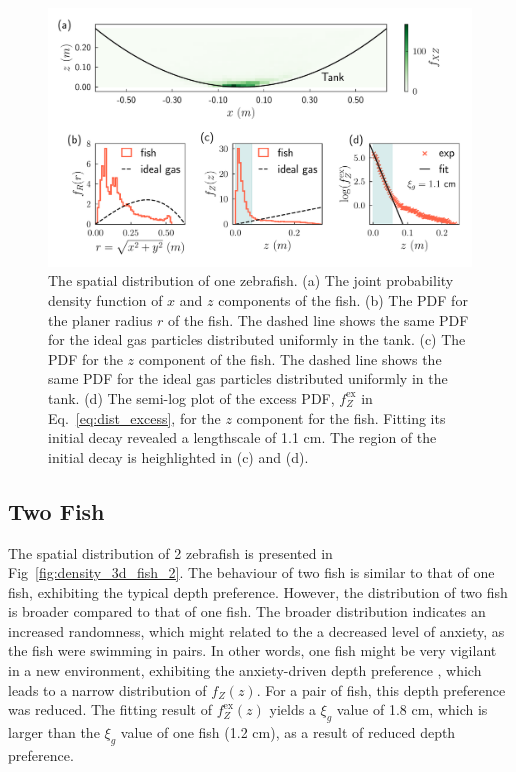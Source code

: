 \documentclass[11pt,twoside]{report}
\begin{document}
\begin{figure}
  \includegraphics[width=\linewidth]{density-one-fish}
  \caption[The 3D spatial distribution of one fish]{
  The spatial distribution of one zebrafish.
  (a) The joint probability density function of $x$ and $z$ components of the fish.
  (b) The PDF for the planer radius $r$ of the fish. The dashed line shows the same PDF for the ideal gas particles distributed uniformly in the tank.
  (c) The PDF for the $z$ component of the fish. The dashed line shows the same PDF for the ideal gas particles distributed uniformly in the tank.
  (d) The semi-log plot of the excess PDF, $f_Z^\mathrm{ex}$ in Eq.~\ref{eq:dist_excess}, for the $z$ component for the fish. Fitting its initial decay revealed a lengthscale of 1.1 cm. The region of the initial decay is heighlighted in (c) and (d).
}
  \label{fig:density_3d_fish_1}
\end{figure}


\subsection{Two Fish}
\label{section:fish_2_3d}


The spatial distribution of 2 zebrafish is presented in Fig~\ref{fig:density_3d_fish_2}. The behaviour of two fish is similar to that of one fish, exhibiting the typical depth preference. However, the distribution of two fish is broader compared to that of one fish.
The broader distribution indicates an increased randomness, which might related to the a decreased level of anxiety, as the fish were swimming in pairs. In other words, one fish might be very vigilant in a new environment, exhibiting the anxiety-driven depth preference \cite{cachat2011}, which leads to a narrow distribution of $f_Z(z)$. For a pair of fish, this depth preference was reduced. The fitting result of $f_Z^\mathrm{ex}(z)$ yields a $\xi_g$ value of 1.8 cm, which is larger than the $\xi_g$ value of one fish (1.2 cm), as a result of reduced depth preference.
\end{document}
